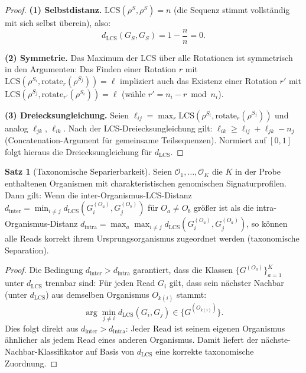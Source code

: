 ﻿\documentclass[a4paper,12pt]{article}
\theoremstyle{definition}
\newtheorem{satz}{Satz}
\begin{document}
\begin{proof}
	\textbf{(1) Selbstdistanz.}
	$\mathrm{LCS}(\rho^S, \rho^S) = n$ (die Sequenz stimmt vollständig
	mit sich selbst überein), also:
	\[
	d_{\mathrm{LCS}}(G_S, G_S) = 1 - \frac{n}{n} = 0.
	\]
	
	\textbf{(2) Symmetrie.}
	Das Maximum der LCS \"{u}ber alle Rotationen ist symmetrisch in den
	Argumenten: Das Finden einer Rotation $r$ mit
	$\mathrm{LCS}(\rho^{S_i}, \mathrm{rotate}_r(\rho^{S_j})) = \ell$
	impliziert auch das Existenz einer Rotation $r'$ mit
	$\mathrm{LCS}(\rho^{S_j}, \mathrm{rotate}_{r'}(\rho^{S_i})) = \ell$
	(wähle $r' = n_i - r \bmod n_i$).
	
	\textbf{(3) Dreiecksungleichung.}
	Seien $\ell_{ij} = \max_r \mathrm{LCS}(\rho^{S_i}, \mathrm{rotate}_r(\rho^{S_j}))$
	und analog $\ell_{jk}$, $\ell_{ik}$.
	Nach der LCS-Dreiecksungleichung gilt:
	$\ell_{ik} \geq \ell_{ij} + \ell_{jk} - n_j$
	(Concatenation-Argument für gemeinsame Teilsequenzen).
	Normiert auf $[0,1]$ folgt hieraus die Dreiecksungleichung für
	$d_{\mathrm{LCS}}$. 
\end{proof}

\begin{satz}[Taxonomische Separierbarkeit]
	\label{satz:taxonomie}
	Seien $\mathcal{O}_1, \ldots, \mathcal{O}_K$ die $K$ in der Probe enthaltenen
	Organismen mit charakteristischen genomischen Signaturprofilen. Dann gilt:
	Wenn die inter-Organismus-LCS-Distanz
	$d_{\mathrm{inter}} = \min_{i \neq j} d_{\mathrm{LCS}}(G_i^{(O_a)}, G_j^{(O_b)})$
	für $O_a \neq O_b$ größer ist als die intra-Organismus-Distanz
	$d_{\mathrm{intra}} = \max_{a} \max_{i \neq j} d_{\mathrm{LCS}}(G_i^{(O_a)}, G_j^{(O_a)})$,
	so können alle Reads korrekt ihrem Ursprungsorganismus zugeordnet werden
	(taxonomische Separation).
\end{satz}

\begin{proof}
	Die Bedingung $d_{\mathrm{inter}} > d_{\mathrm{intra}}$ garantiert,
	dass die Klassen $\{G^{(O_a)}\}_{a=1}^K$ unter $d_{\mathrm{LCS}}$ trennbar sind:
	Für jeden Read $G_i$ gilt, dass sein nächster Nachbar (unter $d_{\mathrm{LCS}}$)
	aus demselben Organismus $O_{k(i)}$ stammt:
	\[
	\arg\min_{j \neq i} d_{\mathrm{LCS}}(G_i, G_j) \in
	\{G^{(O_{k(i)})}\}.
	\]
	Dies folgt direkt aus $d_{\mathrm{inter}} > d_{\mathrm{intra}}$:
	Jeder Read ist seinem eigenen Organismus ähnlicher als jedem Read
	eines anderen Organismus. Damit liefert der nächste-Nachbar-Klassifikator
	auf Basis von $d_{\mathrm{LCS}}$ eine korrekte taxonomische Zuordnung. 
\end{proof}
\end{document}
